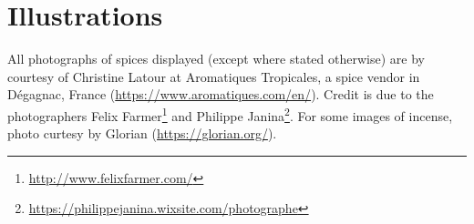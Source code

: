 
\section{Illustrations}


All photographs of spices displayed (except where stated otherwise) are by courtesy of Christine Latour at Aromatiques Tropicales, a spice vendor in Dégagnac, France (\url{https://www.aromatiques.com/en/}). Credit is due to the photographers Felix Farmer\footnote{\url{http://www.felixfarmer.com/}} and Philippe Janina\footnote{\url{https://philippejanina.wixsite.com/photographe}}. For some images of incense, photo curtesy by Glorian (\url{https://glorian.org/}).










